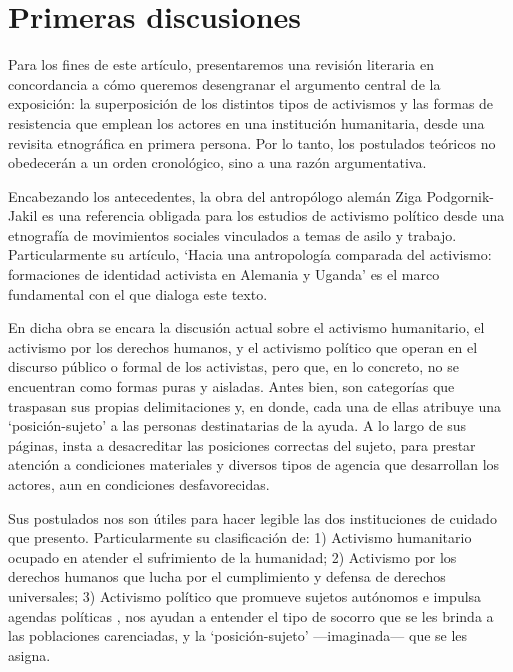 \documentclass[
  spanish,
  11pt,
  a4paper,
]{scrbook}
\begin{document}
\section*{Primeras discusiones}\label{primeras-discusiones}


Para los fines de este artículo, presentaremos una revisión literaria en
concordancia a cómo queremos desengranar el argumento central de la
exposición: la superposición de los distintos tipos de activismos y las
formas de resistencia que emplean los actores en una institución
humanitaria, desde una revisita etnográfica en primera persona. Por lo
tanto, los postulados teóricos no obedecerán a un orden cronológico,
sino a una razón argumentativa.

Encabezando los antecedentes, la obra del antropólogo alemán Ziga
Podgornik-Jakil es una referencia obligada para los estudios de
activismo político desde una etnografía de movimientos sociales
vinculados a temas de asilo y trabajo. Particularmente su artículo,
`Hacia una antropología comparada del activismo: formaciones de
identidad activista en Alemania y Uganda' \autocite{PodgornikJakil2021}
es el marco fundamental con el que dialoga este texto.

En dicha obra se encara la discusión actual sobre el activismo
humanitario, el activismo por los derechos humanos, y el activismo
político que operan en el discurso público o formal de los activistas,
pero que, en lo concreto, no se encuentran como formas puras y aisladas.
Antes bien, son categorías que traspasan sus propias delimitaciones y,
en donde, cada una de ellas atribuye una `posición-sujeto' a las
personas destinatarias de la ayuda. A lo largo de sus páginas, insta a
desacreditar las posiciones correctas del sujeto, para prestar atención
a condiciones materiales y diversos tipos de agencia que desarrollan los
actores, aun en condiciones desfavorecidas.

Sus postulados nos son útiles para hacer legible las dos instituciones
de cuidado que presento. Particularmente su clasificación de: 1)
Activismo humanitario ocupado en atender el sufrimiento de la humanidad;
2) Activismo por los derechos humanos que lucha por el cumplimiento y
defensa de derechos universales; 3) Activismo político que promueve
sujetos autónomos e impulsa agendas políticas
\autocite[300]{PodgornikJakil2021}, nos ayudan a entender el tipo de
socorro que se les brinda a las poblaciones carenciadas, y la
`posición-sujeto' ---imaginada--- que se les asigna.
\end{document}
